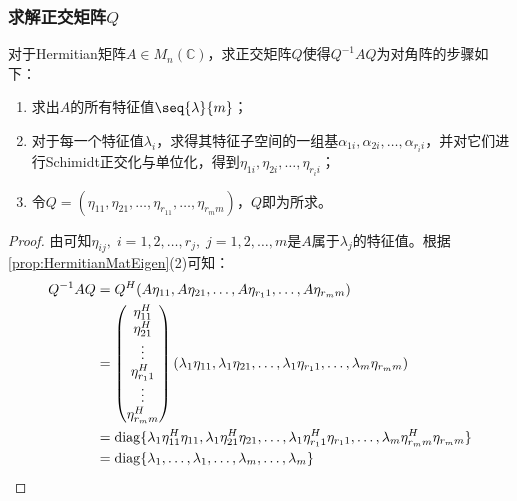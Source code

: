 \subsubsection{求解正交矩阵$Q$}
\begin{theorem}
	对于Hermitian矩阵$A\in M_{n}(\mathbb{C})$，求正交矩阵$Q$使得$Q^{-1}AQ$为对角阵的步骤如下：
	\begin{enumerate}
		\item 求出$A$的所有特征值$\seq{\lambda}{m}$；
		\item 对于每一个特征值$\lambda_i$，求得其特征子空间的一组基$\alpha_{1i},\alpha_{2i},\dots,\alpha_{r_ii}$，并对它们进行Schimidt正交化与单位化，得到$\eta_{1i},\eta_{2i},\dots,\eta_{r_ii}$；
		\item 令$Q=(\eta_{11},\eta_{21},\dots,\eta_{r_11},\dots,\eta_{r_mm})$，$Q$即为所求。
	\end{enumerate}
\end{theorem}
\begin{proof}
	由可知$\eta_{ij},\;i=1,2,\dots,r_j,\;j=1,2,\dots,m$是$A$属于$\lambda_j$的特征值。根据\cref{prop:HermitianMatEigen}(2)可知：
	\begin{align*}
		Q^{-1}AQ
		&=Q^H(A\eta_{11},A\eta_{21},\dots,A\eta_{r_11},\dots,A\eta_{r_mm}) \\
		&=
		\begin{pmatrix}
			\eta_{11}^H \\
			\eta_{21}^H \\
			\vdots \\
			\eta_{r_11}^H \\
			\vdots \\
			\eta_{r_mm}^H
		\end{pmatrix}
		(\lambda_1\eta_{11},\lambda_1\eta_{21},\dots,\lambda_1\eta_{r_11},\dots,\lambda_m\eta_{r_mm}) \\
		&=\operatorname{diag}\{\lambda_1\eta_{11}^H\eta_{11},\lambda_1\eta_{21}^H\eta_{21},\dots,\lambda_1\eta_{r_11}^H\eta_{r_11},\dots,\lambda_m\eta_{r_mm}^H\eta_{r_mm}\} \\
		&=\operatorname{diag}\{\lambda_1,\dots,\lambda_1,\dots,\lambda_m,\dots,\lambda_m\}\qedhere
	\end{align*}
\end{proof}

